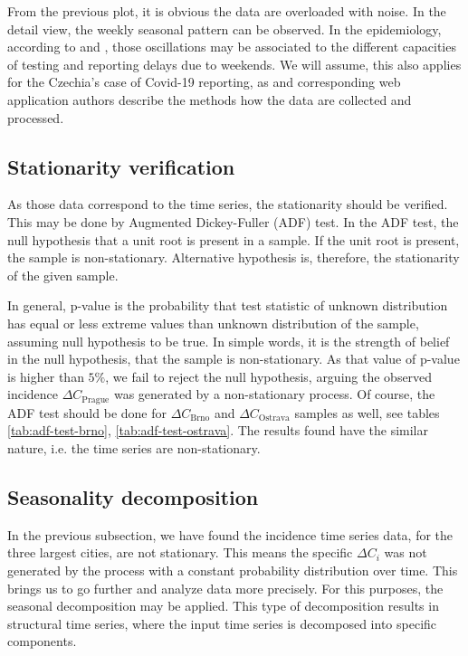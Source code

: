 \documentclass[
  digital, %
  oneside, %
  lof,     %
  lot,     %
]{fithesis4}
\begin{document}
From the previous plot, it is obvious the data are overloaded 
with noise. 
In the detail view, the weekly seasonal pattern can be observed. 
In the epidemiology, according to \cite{liu2021} and \cite{annunziato2020}, 
those oscillations may be associated to the different capacities 
of testing and reporting delays due to weekends. 
We will assume, this also applies for the Czechia's case of 
Covid-19 reporting, as \cite{komenda2020} and corresponding web 
application authors describe the methods how the data are
collected and processed.


\subsection{Stationarity verification}

As those data correspond to the time series, the stationarity 
should be verified. 
This may be done by Augmented Dickey-Fuller (ADF) test. 
In the  ADF test, the null hypothesis that a unit root is 
present in a sample. 
If the unit root is present, the sample is non-stationary. 
Alternative hypothesis is, therefore, the stationarity of 
the given sample.



In general, p-value is the probability that test statistic 
of unknown distribution has equal or less extreme values 
than unknown distribution of the sample, assuming null 
hypothesis to be true. In simple words, it is the strength 
of belief in the null hypothesis, that the sample is 
non-stationary. 
As that value of p-value is higher than $5\%$, we fail to reject 
the null hypothesis, arguing the observed incidence 
$\Delta C_{\text{Prague}}$ was generated by a non-stationary 
process. 
Of course, the ADF test should be done for $\Delta C_{\text{Brno}}$ 
and $\Delta C_{\text{Ostrava}}$ samples as well, 
see tables \ref{tab:adf-test-brno}, \ref{tab:adf-test-ostrava}.
The results found have the similar nature, i.e.
the time series are non-stationary.

\subsection{Seasonality decomposition}

In the previous subsection, we have found the incidence time 
series data, for the three largest cities, are not stationary. 
This means the specific $\Delta C_i$ was not generated by the 
process with a constant probability distribution over time. 
This brings us to go further and analyze data more precisely. 
For this purposes, the seasonal decomposition may be applied. 
This type of decomposition results in structural time series, 
where the input time series is decomposed into specific 
components.
\end{document}
